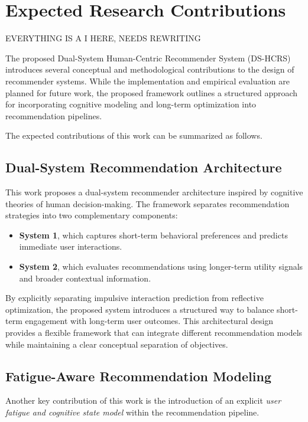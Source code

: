 \section{Expected Research Contributions}

EVERYTHING IS A I HERE, NEEDS REWRITING

The proposed Dual-System Human-Centric Recommender System (DS-HCRS) introduces several conceptual and methodological contributions to the design of recommender systems.
While the implementation and empirical evaluation are planned for future work, the proposed framework outlines a structured approach for incorporating cognitive modeling and long-term optimization into recommendation pipelines.

The expected contributions of this work can be summarized as follows.

\subsection{Dual-System Recommendation Architecture}

This work proposes a dual-system recommender architecture inspired by cognitive theories of human decision-making.
The framework separates recommendation strategies into two complementary components:

\begin{itemize}
    \item \textbf{System 1}, which captures short-term behavioral preferences and predicts immediate user interactions.
    \item \textbf{System 2}, which evaluates recommendations using longer-term utility signals and broader contextual information.
\end{itemize}

By explicitly separating impulsive interaction prediction from reflective optimization, the proposed system introduces a structured way to balance short-term engagement with long-term user outcomes.
This architectural design provides a flexible framework that can integrate different recommendation models while maintaining a clear conceptual separation of objectives.

\subsection{Fatigue-Aware Recommendation Modeling}

Another key contribution of this work is the introduction of an explicit \textit{user fatigue and cognitive state model} within the recommendation pipeline.

